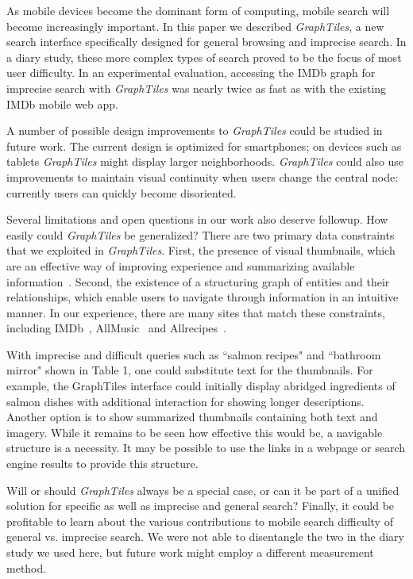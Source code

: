 As mobile devices become the dominant form of computing, mobile search will become increasingly important. In this paper we described \textit{GraphTiles}, a new search interface specifically designed for general browsing and imprecise search. In a diary study, these more complex types of search proved to be the focus of most user difficulty. In an experimental evaluation, accessing the IMDb graph for imprecise search with \textit{GraphTiles} was nearly twice as fast as with the existing IMDb mobile web app.

A number of possible design improvements to \textit{GraphTiles} could be studied in future work. The current design is optimized for smartphones; on devices such as tablets \textit{GraphTiles} might display larger neighborhoods. \textit{GraphTiles} could also use improvements to maintain visual continuity when users change the central node: currently users can quickly become disoriented. 

Several limitations and open questions in our work also deserve followup. How easily could \textit{GraphTiles} be generalized?  There are two primary data constraints that we exploited in \textit{GraphTiles}. First, the presence of visual thumbnails, which are an effective way of improving experience and summarizing available information~\cite{Setlur:2011}. Second, the existence of a structuring graph of entities and their relationships, which enable users to navigate through information in an intuitive manner. In our experience, there are many sites that match these constraints, including IMDb~\cite{imdb}, AllMusic~\cite{allmusic} and Allrecipes~\cite{allrecipes}. 

With imprecise and difficult queries such as ``salmon recipes" and ``bathroom mirror" shown in Table 1, one could substitute text for the thumbnails. For example, the GraphTiles interface could initially display abridged ingredients of salmon dishes with additional interaction for showing longer descriptions. Another option is to show summarized thumbnails containing both text and imagery. While it remains to be seen how effective this would be, a navigable structure is a necessity. It may be possible to use the links in a webpage or search engine results to provide this structure.

Will or should \textit{GraphTiles} always be a special case, or can it be part of a unified solution for specific as well as imprecise and general search? Finally, it could be profitable to learn about the various contributions to mobile search difficulty of general vs. imprecise search. We were not able to disentangle the two in the diary study we used here, but future work might employ a different measurement method.
